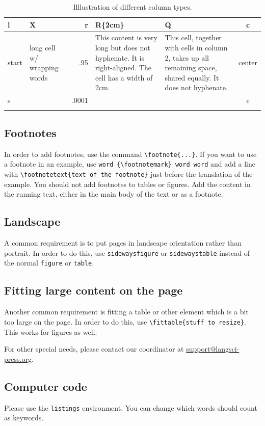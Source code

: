 \begin{table}
 \begin{tabularx}{\textwidth}{lXrR{2cm}Qc}
\lsptoprule
l & X & r & R\{2cm\} & Q & c \\
\midrule
  start & long cell w/   wrapping words & .95 & This content is very long but does not hyphenate. It is right-aligned. The cell has a width of 2cm. & This cell, together with cells in column 2, takes up all remaining space, shared equally. It does not hyphenate. & center\\
s & & .0001 & &&  c \\ 
\lspbottomrule
\end{tabularx} 
\caption{Illlustration of different column types.}
\label{tab:colmixes}
\end{table}


\subsection{Footnotes}
In order to add footnotes, use the command \verb+\footnote{...}+. If you want to use a footnote in an example, use \verb+word {\footnotemark} word word+ and add a line with \verb+\footnotetext{text of the footnote}+ just before the translation of the example. You should not add footnotes to tables or figures. Add the content in the running text, either in the main body of the text or as a footnote. 

\subsection{Landscape}

A common requirement is to put pages in landscape orientation rather than portrait. In order to do this, use \verb+sidewaysfigure+ or \verb+sidewaystable+ instead of the normal \verb+figure+ or \verb+table+.

\subsection{Fitting large content on the page}
Another common requirement is fitting a table or other element which is a bit too large on the page. In order to do this, use \verb+\fittable{stuff to resize}+. This works for figures as well. 

For other special needs, please contact our coordinator at \url{support@langsci-press.org}. 

\subsection{Computer code}
Please use the \verb+listings+ environment. You can change which words should count as keywords.

